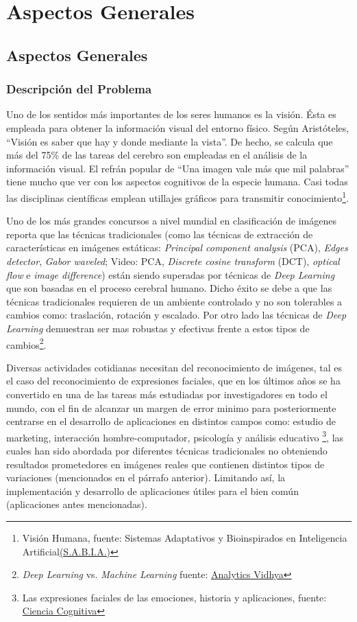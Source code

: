 \chapter{Aspectos Generales}
\section{Aspectos Generales}
\subsection{Descripción del Problema}
Uno de los sentidos más importantes de los seres humanos es la visión. Ésta es empleada para obtener la información visual del entorno físico. Según Aristóteles, “Visión es saber que hay y donde mediante la vista”. De hecho, se calcula que más del 75\% de las tareas del cerebro son empleadas en el análisis de la información visual. El refrán popular de “Una imagen vale más que mil palabras” tiene mucho que ver con los aspectos cognitivos de la especie humana. Casi todas las disciplinas científicas emplean utillajes gráficos para transmitir conocimiento\footnote[1]{Visión Humana, fuente: Sistemas Adaptativos y Bioinspirados en Inteligencia Artificial\href{http://sabia.tic.udc.es/}{(S.A.B.I.A.)}}.

Uno de los más grandes concursos a nivel mundial en clasificación de imágenes reporta que las técnicas tradicionales (como las técnicas de extracción de características en imágenes estáticas: \textit{Principal component analysis} (PCA), \textit{Edges detector}, \textit{Gabor waveled}; Video: PCA, \textit{Discrete cosine transform} (DCT), \textit{optical flow} e \textit{image difference}) están siendo superadas por técnicas de \textit{Deep Learning} que son basadas en el proceso cerebral humano. Dicho éxito se debe a que las técnicas tradicionales requieren de un ambiente controlado y no son tolerables a cambios como: traslación, rotación y escalado. Por otro lado las técnicas de \textit{Deep Learning} demuestran ser mas robustas y efectivas frente a estos tipos de cambios\footnote[2]{\textit{Deep Learning} vs. \textit{Machine Learning} fuente: \href{http://www.image-net.org/}{Analytics Vidhya}}.
	
Diversas actividades cotidianas necesitan del reconocimiento de imágenes, tal es el caso del reconocimiento de expresiones faciales, que en los últimos años se ha convertido en una de las tareas más estudiadas por investigadores en todo el mundo, con el fin de alcanzar un margen de error minimo para posteriormente centrarse en el desarrollo de aplicaciones en distintos campos como: estudio de marketing, interacción hombre-computador, psicología y análisis educativo \footnote[3]{Las expresiones faciales de las emociones, historia y aplicaciones, fuente: \href{http://medina-psicologia.ugr.es/cienciacognitiva/?p=664}{Ciencia Cognitiva}}, las cuales han sido abordada por diferentes técnicas tradicionales no obteniendo resultados prometedores en imágenes reales que contienen distintos tipos de variaciones (mencionados en el párrafo anterior). Limitando así, la implementación y desarrollo de aplicaciones útiles para el bien común (aplicaciones antes mencionadas).

